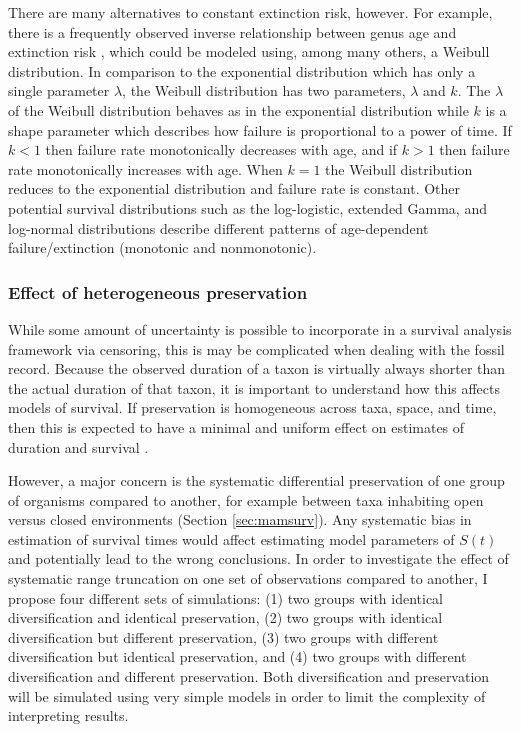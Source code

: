 \documentclass[12pt,letterpaper]{article}
\begin{document}
There are many alternatives to constant extinction risk, however. For example, there is a frequently observed inverse relationship between genus age and extinction risk \citep{Finnegan2008}, which could be modeled using, among many others, a Weibull distribution. In comparison to the exponential distribution which has only a single parameter \(\lambda\), the Weibull distribution has two parameters, \(\lambda\) and \(k\). The \(\lambda\) of the Weibull distribution behaves as in the exponential distribution while \(k\) is a shape parameter which describes how failure is proportional to a power of time. If \(k < 1\) then failure rate monotonically decreases with age, and if \(k > 1\) then failure rate monotonically increases with age. When \(k = 1\) the Weibull distribution reduces to the exponential distribution and failure rate is constant. Other potential survival distributions such as the log-logistic, extended Gamma, and log-normal distributions \citep{Kleinbaum2005} describe different patterns of age-dependent failure/extinction (monotonic and nonmonotonic).

\subsubsection{Effect of heterogeneous preservation} \label{sec:survsim}
While some amount of uncertainty is possible to incorporate in a survival analysis framework via censoring, this is may be complicated when dealing with the fossil record. Because the observed duration of a taxon is virtually always shorter than the actual duration of that taxon, it is important to understand how this affects models of survival. If preservation is homogeneous across taxa, space, and time, then this is expected to have a minimal and uniform effect on estimates of duration and survival \citep{Sepkoski1975,Foote1996e,Foote1997c}.

However, a major concern is the systematic differential preservation of one group of organisms compared to another, for example between taxa inhabiting open versus closed environments (Section \ref{sec:mamsurv}). Any systematic bias in estimation of survival times would affect estimating model parameters of \(S(t)\) and potentially lead to the wrong conclusions. In order to investigate the effect of systematic range truncation on one set of observations compared to another, I propose four different sets of simulations: (1) two groups with identical diversification and identical preservation, (2) two groups with identical diversification but different preservation, (3) two groups with different diversification but identical preservation, and (4) two groups with different diversification and different preservation. Both diversification and preservation will be simulated using very simple models in order to limit the complexity of interpreting results. 
\end{document}
